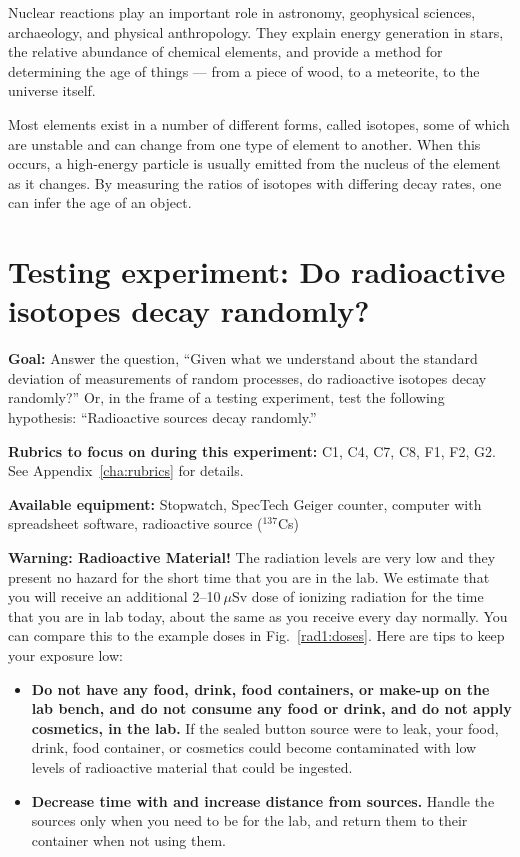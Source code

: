 Nuclear reactions play an important role in astronomy, geophysical sciences, archaeology, and physical anthropology. They explain energy generation in stars, the relative abundance of chemical elements, and provide a method for determining the age of things --- from a piece of wood, to a meteorite, to the universe itself.

Most elements exist in a number of different forms, called isotopes, some of which are unstable and can change from one type of element to another. When this occurs, a high-energy particle is usually emitted from the nucleus of the element as it changes. By measuring the ratios of isotopes with differing decay rates, one can infer the age of an object.

\section{Testing experiment: Do radioactive isotopes decay randomly?}

\textbf{Goal:} Answer the question, ``Given what we understand about the standard deviation of measurements of random processes, do radioactive isotopes decay randomly?'' Or, in the frame of a testing experiment, test the following hypothesis: ``Radioactive sources decay randomly.''

\textbf{Rubrics to focus on during this experiment:} C1, C4, C7, C8, F1, F2, G2. See Appendix~\ref{cha:rubrics} for details.

\textbf{Available equipment:} Stopwatch, SpecTech Geiger counter, computer with spreadsheet software, radioactive source ($^{137}$Cs)

\begin{framed}
	\textbf{Warning: Radioactive Material!} The radiation levels are very low and they present no hazard for the short time that you are in the lab. We estimate that you will receive an additional 2--10$\:\mu$Sv dose of ionizing radiation for the time that you are in lab today, about the same as you receive every day normally. You can compare this to the example doses in Fig.~\ref{rad1:doses}. Here are tips to keep your exposure low:
	\begin{itemize}
		\item \textbf{Do not have any food, drink, food containers, or make-up on the lab bench, and do not consume any food or drink, and do not apply cosmetics, in the lab.}
		If the sealed button source were to leak, your food, drink, food container, or cosmetics could become contaminated with low levels of radioactive material that could be ingested.
		
		\item \textbf{Decrease time with and increase distance from sources.} Handle the sources only when you need to be for the lab, and return them to their container when not using them.
	\end{itemize}
\end{framed}

